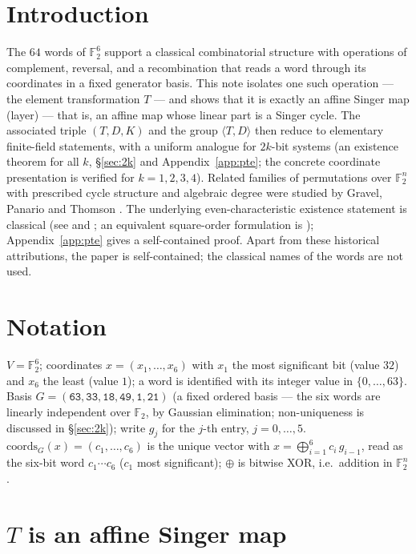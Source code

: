 \documentclass[11pt]{article}
\begin{document}
\section{Introduction}\label{sec:intro}
The $64$ words of $\mathbb{F}_2^6$ support a classical combinatorial structure with
operations of complement, reversal, and a recombination that reads a word through its
coordinates in a fixed generator basis. This note isolates one such operation --- the
element transformation $T$ --- and shows that it is exactly an affine Singer map (layer) --- that is, an affine map whose
linear part is a Singer cycle. The
associated triple $(T,D,K)$ and the group $\langle T,D\rangle$ then reduce to
elementary finite-field statements, with a uniform analogue for $2k$-bit systems
(an existence theorem for all $k$, \S\ref{sec:2k} and Appendix~\ref{app:pte}; the concrete coordinate presentation is verified for $k=1,2,3,4$). Related families of
permutations over $\mathbb{F}_2^n$ with prescribed cycle structure and algebraic
degree were studied by Gravel, Panario and Thomson \cite{GPT}. The underlying
even-characteristic existence statement is classical (see \cite{Mor} and
\cite[Theorem~1, p.~1]{Coh90}; an equivalent square-order formulation is \cite[Theorem~1.5, p.~170]{Coh});
Appendix~\ref{app:pte} gives a self-contained proof.
Apart from these historical attributions, the paper is self-contained; the classical
names of the words are not used.

\section{Notation}\label{sec:not}
$V=\mathbb{F}_2^6$; coordinates $x=(x_1,\dots,x_6)$ with $x_1$ the most significant
bit (value $32$) and $x_6$ the least (value $1$); a word is identified with its
integer value in $\{0,\dots,63\}$. Basis $G=(\texttt{63},\texttt{33},\texttt{18},
\texttt{49},\texttt{1},\texttt{21})$ (a fixed ordered basis --- the six words are linearly independent over $\mathbb{F}_2$, by Gaussian elimination; non-uniqueness is discussed in \S\ref{sec:2k}); write $g_j$ for
the $j$-th entry, $j=0,\dots,5$.
$\mathrm{coords}_G(x)=(c_1,\dots,c_6)$ is the unique vector with
$x=\bigoplus_{i=1}^6 c_i\,g_{i-1}$, read as the six-bit word $c_1\cdots c_6$
($c_1$ most significant); $\oplus$ is bitwise XOR, i.e.~addition in $\mathbb{F}_2^n$.

\section[Affine Singer map]{$T$ is an affine Singer map}\label{sec:T}
\end{document}
